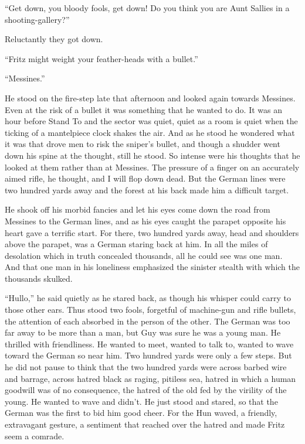 ``Get down, you bloody fools, get down! Do you think you are Aunt Sallies in a shooting-gallery?''

Reluctantly they got down.

``Fritz might weight your feather-heads with a bullet.''

``Messines.''

He stood on the fire-step late that afternoon and looked again towards Messines. Even at the risk of a bullet it was something that he wanted to do. It was an hour before Stand To and the sector was quiet, quiet as a room is quiet when the ticking of a mantelpiece clock shakes the air. And as he stood he wondered what it was that drove men to risk the sniper's bullet, and though a shudder went down his spine at the thought, still he stood. So intense were his thoughts that he looked at them rather than at Messines. The pressure of a finger on an accurately aimed rifle, he thought, and I will flop down dead. But the German lines were two hundred yards away and the forest at his back made him a difficult target.

He shook off his morbid fancies and let his eyes come down the road from Messines to the German lines, and as his eyes caught the parapet opposite his heart gave a terrific start. For there, two hundred yards away, head and shoulders above the parapet, was a German staring back at him. In all the miles of desolation which in truth concealed thousands, all he could see was one man. And that one man in his loneliness emphasized the sinister stealth with which the thousands skulked.

``Hullo,'' he said quietly as he stared back, as though his whisper could carry to those other ears. Thus stood two fools, forgetful of machine-gun and rifle bullets, the attention of each absorbed in the person of the other. The German was too far away to be more than a man, but Guy was sure he was a young man. He thrilled with friendliness. He wanted to meet, wanted to talk to, wanted to wave toward the German so near him. Two hundred yards were only a few steps. But he did not pause to think that the two hundred yards were across barbed wire and barrage, across hatred black as raging, pitiless sea, hatred in which a human goodwill was of no consequence, the hatred of the old fed by the virility of the young. He wanted to wave and didn't. He just stood and stared, so that the German was the first to bid him good cheer. For the Hun waved, a friendly, extravagant gesture, a sentiment that reached over the hatred and made Fritz seem a comrade.

